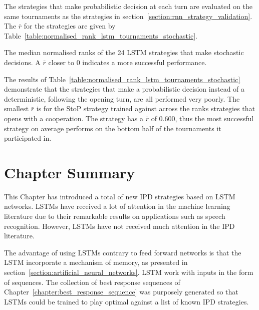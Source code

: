 The \lstmstrategies strategies that make probabilistic decision at each turn
are evaluated on the same \metatournamentslstm tournaments as the strategies
in section~\ref{section:rnn_strategy_validation}. The \(\bar{r}\) for the
strategies are given by Table~\ref{table:normalised_rank_lstm_tournaments_stochastic}.

\begin{table}[!htbp]
    \begin{center}
    \resizebox{.9\textwidth}{!}{
        
    }
\end{center}
\caption{The median normalised ranks of the 24 LSTM strategies that make stochastic
decisions. A \(\bar{r}\) closer to 0 indicates a more successful performance.}
\label{table:normalised_rank_lstm_tournaments_stochastic}
\end{table}

The results of Table~\ref{table:normalised_rank_lstm_tournaments_stochastic}
demonstrate that the strategies that make a probabilistic decision instead of a
deterministic, following the opening turn, are all performed very poorly. The
smallest \(\bar{r}\) is for the StoP strategy trained against across the ranks
strategies that opens with a cooperation. The strategy has a \(\bar{r}\) of 0.600,
thus the most successful strategy on average performs on the bottom half of
the tournaments it participated in.


\section{Chapter Summary}

This Chapter has introduced a total of \lstmnetworks new IPD strategies based on
LSTM networks. LSTMs have received a lot of attention in the machine learning
literature due to their remarkable results on applications such as speech
recognition. However, LSTMs have not received much attention in the IPD
literature.

The advantage of using LSTMs contrary to feed forward networks is that the LSTM
incorporate a mechanism of memory, as presented in
section~\ref{section:artificial_neural_networks}. LSTM work with inputs in the
form of sequences. The collection of best response sequences of
Chapter~\ref{chapter:best_response_sequence} was purposely generated so that
LSTMs could be trained to play optimal against a list of known IPD strategies.

